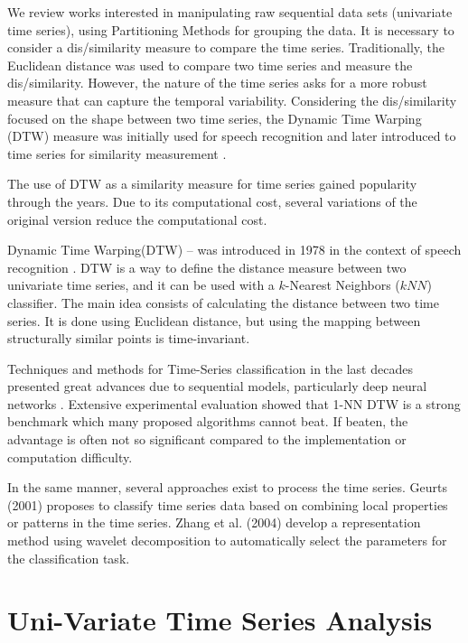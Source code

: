 We review works interested in manipulating raw sequential data sets (univariate time series), using Partitioning Methods \cite{Kaufman2009} for grouping the data. It is necessary to consider a dis/similarity measure to compare the time series. Traditionally, the Euclidean distance was used to compare two time series and measure the dis/similarity. However, the nature of the time series asks for a more robust measure that can capture the temporal variability. Considering the dis/similarity focused on the shape between two time series, the Dynamic Time Warping (DTW) measure was initially used for speech recognition and later introduced to time series for similarity measurement \cite{Sakoe1978}.

The use of DTW as a similarity measure for time series gained popularity through the years. Due to its computational cost, several variations of the original version reduce the computational cost. 

Dynamic Time Warping(DTW) – was introduced in 1978 in the context of speech recognition \cite{Sakoe1978}. DTW is a way to define the distance measure between two univariate time series, and it can be used with a $k$-Nearest Neighbors ($kNN$) classifier. The main idea consists of calculating the distance between two time series. It is done using Euclidean distance, but using the mapping between structurally similar points is time-invariant.

Techniques and methods for Time-Series classification in the last decades presented great advances due to sequential models, particularly deep neural networks \cite{Fawaz2019}. Extensive experimental evaluation showed that 1-NN DTW is a strong benchmark which many proposed algorithms cannot beat. If beaten, the advantage is often not so significant compared to the implementation or computation difficulty.

In the same manner, several approaches exist to process the time series. Geurts (2001) proposes to classify time series data based on combining local properties or patterns in the time series. Zhang et al. (2004) develop a representation method using wavelet decomposition to automatically select the parameters for the classification task. 

\section{Uni-Variate Time Series Analysis}
\label{Sec:TSAnalysis}

